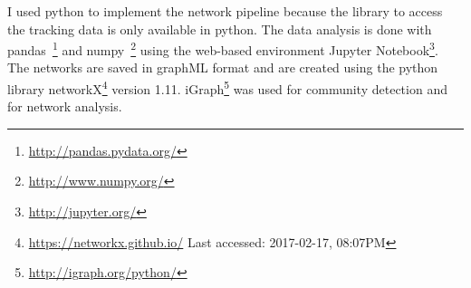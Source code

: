 I used python to implement the network pipeline because the library to access the tracking data is only available in python.
The data analysis is done with pandas~\footnote{\url{http://pandas.pydata.org/}} and numpy~\footnote{\url{http://www.numpy.org/}} using the web-based environment Jupyter Notebook\footnote{\url{http://jupyter.org/}}.
The networks are saved in graphML format and are created using the python library networkX\footnote{\url{https://networkx.github.io/} Last accessed: 2017-02-17, 08:07PM} version 1.11. iGraph\footnote{\url{http://igraph.org/python/}} was used for community detection and for network analysis.
